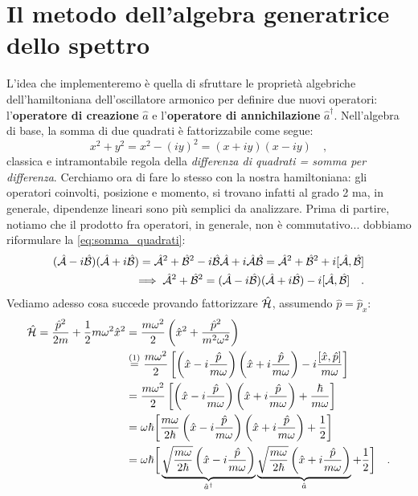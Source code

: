 \section{Il metodo dell'algebra generatrice dello spettro}
L'idea che implementeremo è quella di sfruttare le proprietà algebriche dell'hamiltoniana dell'oscillatore armonico per definire due nuovi operatori: l'\textbf{operatore di creazione} $\hat{a}$ e l'\textbf{operatore di annichilazione} $\hat{a}^\dagger$. Nell'algebra di base, la somma di due quadrati è fattorizzabile come segue:
\begin{equation}
    x^2 + y^2 = x^2 - (iy)^2 = (x+iy)(x-iy) \quad,
    \label{eq:somma_quadrati}
\end{equation}
classica e intramontabile regola della \emph{differenza di quadrati = somma per differenza}. Cerchiamo ora di fare lo stesso con la nostra hamiltoniana: gli operatori coinvolti, posizione e momento, si trovano infatti al grado 2 ma, in generale, dipendenze lineari sono più semplici da analizzare. Prima di partire, notiamo che il prodotto fra operatori, in generale, non è commutativo... dobbiamo riformulare la \eqref{eq:somma_quadrati}:
\begin{equation}
\begin{aligned}
    (\hat{\mathcal{A}} - i\hat{\mathcal{B}})(\hat{\mathcal{A}} + i\hat{\mathcal{B}}) = \hat{\mathcal{A}}^2 + \hat{\mathcal{B}}^2 - i\hat{\mathcal{B}}\hat{\mathcal{A}} + i\hat{\mathcal{A}}\hat{\mathcal{B}} = \hat{\mathcal{A}}^2 + \hat{\mathcal{B}}^2 +i[\hat{\mathcal{A}},\hat{\mathcal{B}}] \\
    \implies \hat{\mathcal{A}}^2 + \hat{\mathcal{B}}^2 = (\hat{\mathcal{A}} - i\hat{\mathcal{B}})(\hat{\mathcal{A}} + i\hat{\mathcal{B}}) - i[\hat{\mathcal{A}},\hat{\mathcal{B}}] \quad.
\end{aligned}
\label{eq:somma_diff_operatori}
\end{equation}
Vediamo adesso cosa succede provando fattorizzare $\hat{\mathcal{H}}$, assumendo $\hat{p} = \hat{p}_x$:
\[
\begin{aligned}
    \hat{\mathcal{H}} = \frac{\hat{p}^2}{2m} + \frac{1}{2}m\omega^2\hat{x}^2 &=  \frac{m\omega^2}{2}\left( \hat{x}^2 + \frac{\hat{p}^2}{m^2\omega^2}  \right) \\
    &\overset{(1)}{=}  \frac{m\omega^2}{2}\left[\left( \hat{x} - i\frac{\hat{p}}{m\omega}  \right)\left( \hat{x} + i\frac{\hat{p}}{m\omega}  \right)-i \frac{[\hat{x}, \hat{p}]}{m\omega}\right] \\
    &= \frac{m\omega^2}{2}\left[\left( \hat{x} - i\frac{\hat{p}}{m\omega}  \right)\left( \hat{x} + i\frac{\hat{p}}{m\omega}  \right)+ \frac{\hbar}{m\omega}\right] \\
    &= \omega\hbar\bigg[\frac{m\omega}{2\hbar}\left( \hat{x} - i\frac{\hat{p}}{m\omega}\right)   \left( \hat{x} + i\frac{\hat{p}}{m\omega}  \right)+ \frac{1}{2}\bigg] \\
    &= \omega\hbar\bigg[\underbrace{\sqrt{\frac{m\omega}{2\hbar}}\left( \hat{x} - i\frac{\hat{p}}{m\omega}  \right)}_{\hat{a}^\dagger} \underbrace{\sqrt{\frac{m\omega}{2\hbar}}\left(\hat{x} + i\frac{\hat{p}}{m\omega}  \right)}_{\hat{a}}+ \frac{1}{2}\bigg] \quad.
\end{aligned}
\]
